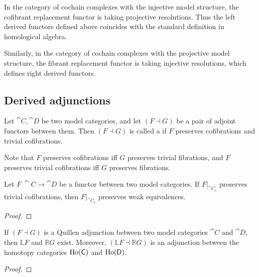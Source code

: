 \begin{example}
    In the category of cochain complexes with the injective model structure,
    the cofibrant replacement functor is taking projective resolutions.
    Thus the left derived functors defined above coincides with
    the standard definition in homological algebra.

    Similarly, in the category of cochain complexes with the projective model structure,
    the fibrant replacement functor is taking injective resolutions,
    which defines right derived functors. \varqed
\end{example}

\subsection{Derived adjunctions}

\nex

\begin{definition}
    Let $\cat C,\cat D$ be two model categories,
    and let $(F\dashv G)$ be a pair of adjoint functors between them.
    Then $(F\dashv G)$ is called a 
    if $F$ preserves cofibrations and trivial cofibrations.
\end{definition}

Note that $F$ preserves cofibrations iff $G$ preserves trivial fibrations,
and $F$ preserves trivial cofibrations iff $G$ preserves fibrations.

\begin{lemma}
    Let $F\:\cat C\to\cat D$ be a functor between two model categories.
    If $F|_{\cat C_{\mathrm c}}$ preserves trivial cofibrations,
    then $F|_{\cat C_{\mathrm c}}$ preserves weak equivalences.
\end{lemma}

\begin{proof}
    \nyw
\end{proof}

\begin{corollary}
    If $(F\dashv G)$ is a Quillen adjunction
    between two model categories $\cat C$ and $\cat D$,
    then $\mathbb LF$ and $\mathbb RG$ exist.
    Moreover, $(\mathbb LF\dashv\mathbb RG)$
    is an adjunction between the homotopy categories $\operatorname{Ho}(\mathsf{C})$ and $\operatorname{Ho}(\mathsf{D})$.
\end{corollary}

\begin{proof}
    \nyw
\end{proof}

